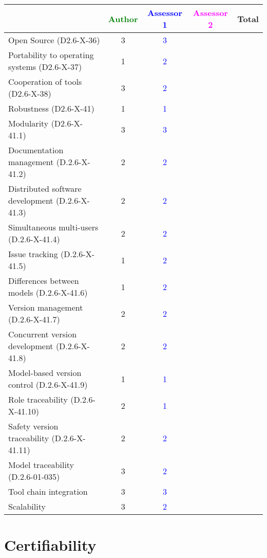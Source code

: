 \begin{tabular}{|l | c | c | c | c|}
\hline
& \textcolor{green}{Author} & \textcolor{blue}{Assessor 1} & \textcolor{magenta}{Assessor 2} & Total \\
\hline
Open Source (D2.6-X-36) & 3 & \textcolor{blue}{3} & & \\
\hline
Portability to operating systems (D2.6-X-37) & 1 & \textcolor{blue}{2} & & \\
\hline
Cooperation of tools (D2.6-X-38) & 3 & \textcolor{blue}{2} & & \\
\hline
Robustness (D2.6-X-41) & 1 & \textcolor{blue}{1} & & \\
\hline
Modularity (D2.6-X-41.1) & 3 & \textcolor{blue}{3} & & \\
\hline
Documentation management (D.2.6-X-41.2) & 2 & \textcolor{blue}{2} & & \\
\hline
Distributed software development (D.2.6-X-41.3) & 2 & \textcolor{blue}{2} & & \\
\hline
Simultaneous multi-users (D.2.6-X-41.4) & 2 & \textcolor{blue}{2} & & \\
\hline
Issue tracking (D.2.6-X-41.5) & 1 & \textcolor{blue}{2} & & \\
\hline
Differences between models (D.2.6-X-41.6) & 1 & \textcolor{blue}{2} & & \\
\hline
Version management (D.2.6-X-41.7) & 2 & \textcolor{blue}{2} & & \\
\hline
Concurrent version development (D.2.6-X-41.8) & 2 & \textcolor{blue}{2} & & \\
\hline
Model-based version control (D.2.6-X-41.9) & 1 & \textcolor{blue}{1} & & \\
\hline
Role traceability (D.2.6-X-41.10) & 2 & \textcolor{blue}{1} & & \\
\hline
Safety version traceability (D.2.6-X-41.11) & 2 & \textcolor{blue}{2} & & \\
\hline
Model traceability (D.2.6-01-035) & 3 & \textcolor{blue}{2} & & \\
\hline
Tool chain integration & 3 & \textcolor{blue}{3} & & \\
\hline
Scalability & 3 & \textcolor{blue}{2} & & \\
\hline
\end{tabular}

\section{Certifiability}

